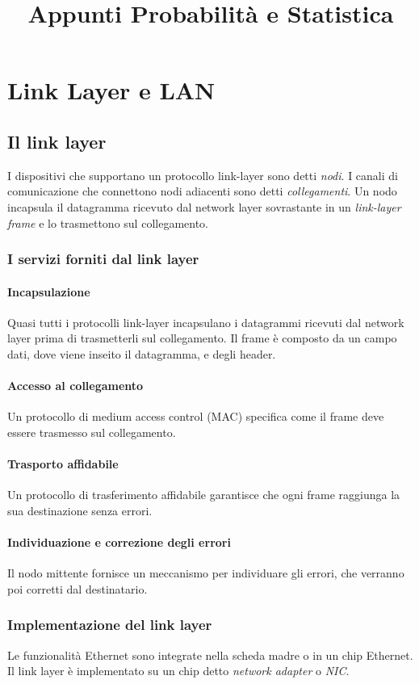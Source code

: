 \documentclass[11pt]{book}
\title{Appunti Probabilità e Statistica}
\begin{document}
\chapter*{Link Layer e LAN}
\section*{Il link layer}
I dispositivi che supportano un protocollo link-layer sono detti \textit{nodi}. I canali di comunicazione che connettono
nodi adiacenti sono detti \textit{collegamenti}. Un nodo incapsula il datagramma ricevuto dal network layer sovrastante 
in un \textit{link-layer frame} e lo trasmettono sul collegamento.
\subsection*{I servizi forniti dal link layer}
\subsubsection*{Incapsulazione}
Quasi tutti i protocolli link-layer incapsulano i datagrammi ricevuti dal network layer prima di trasmetterli sul collegamento.
Il frame è composto da un campo dati, dove viene inseito il datagramma, e degli header.
\subsubsection*{Accesso al collegamento}
Un protocollo di medium access control (MAC) specifica come il frame deve essere trasmesso sul collegamento. 
\subsubsection*{Trasporto affidabile}
Un protocollo di trasferimento affidabile garantisce che ogni frame raggiunga la sua destinazione senza errori.
\subsubsection*{Individuazione e correzione degli errori}
Il nodo mittente fornisce un meccanismo per individuare gli errori, che verranno poi corretti dal destinatario.
\subsection*{Implementazione del link layer}
Le funzionalità Ethernet sono integrate nella scheda madre o in un chip Ethernet. Il link layer è implementato su un chip 
detto \textit{network adapter} o \textit{NIC}. 
\end{document}
